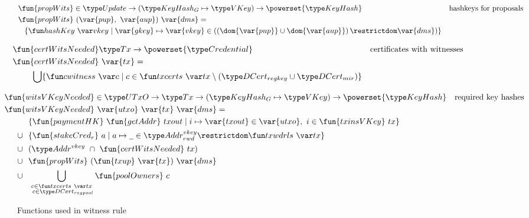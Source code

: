 \begin{figure}[htb]
  \begin{align*}
    & \fun{propWits} \in \Update \to (\KeyHashGen\mapsto\VKey) \to \powerset{\KeyHash}
    & \text{hashkeys for proposals} \\
    & \fun{propWits}~(\var{pup},~\var{aup})~\var{dms} = \\
    & ~~\left\{
      \hashKey{vkey}
      \mid
      \var{gkey}\mapsto\var{vkey}\in
      \left(\left(\dom{\var{pup}}\cup\dom{\var{aup}}\right)\restrictdom\var{dms}\right)
      \right\}
  \end{align*}

  \begin{align*}
    & \hspace{-0.8cm}\fun{certWitsNeeded} \Tx \to \powerset{\Credential}
    & \text{certificates with witnesses} \\
    &  \hspace{-0.8cm}\fun{certWitsNeeded}~\var{tx} = \\
    & \bigcup\{\cwitness{c} \mid c \in \txcerts{tx} \setminus (\DCertRegKey\cup\DCertMir)\}
  \end{align*}

    \begin{align*}
    & \hspace{-0.8cm}\fun{witsVKeyNeeded} \in \UTxO \to \Tx \to (\KeyHashGen\mapsto\VKey) \to
      \powerset{\KeyHash}
    & \text{required key hashes} \\
    &  \hspace{-0.8cm}\fun{witsVKeyNeeded}~\var{utxo}~\var{tx}~\var{dms} = \\
    & ~~\{ \fun{paymentHK}~\fun{getAddr}~{txout} \mid i \mapsto \var{txout} \in \var{utxo},~i\in\fun{txinsVKey}~{tx} \} \\
    \cup & ~~
           \{\fun{stakeCred_r}~a\mid a\mapsto \wcard \in \AddrRWDVKey
      \restrictdom \txwdrls{tx}\}\\
    \cup & ~~(\AddrVKey ~\cap~\fun{certWitsNeeded}~{tx}) \\
    \cup & ~~\fun{propWits}~(\fun{txup}~\var{tx})~\var{dms} \\
    \cup & ~~\bigcup_{\substack{c \in \txcerts{tx} \\ ~c \in\DCertRegPool}} \fun{poolOwners}~{c}
  \end{align*}
  \caption{Functions used in witness rule}
  \label{fig:functions-witnesses}
\end{figure}


